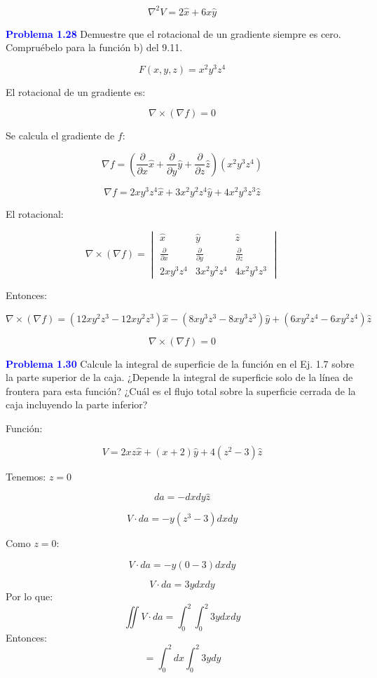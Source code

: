 \documentclass{article}
\newcommand{\question}[1]{\textcolor{blue}{\textbf{#1}}}
\begin{document}
\[
\boxed{\nabla^2 V = 2 \hat{x} + 6x \hat{y}}
\]

\question{Problema 1.28} Demuestre que el rotacional de un gradiente siempre es cero. Compruébelo para la función b) del 9.11.

\[
F(x,y,z) = x^2 y^3 z^4
\]

El rotacional de un gradiente es:

\[
\nabla \times (\nabla f) = 0
\]

Se calcula el gradiente de \( f \):

\[
\nabla f = \left( \frac{\partial}{\partial x} \hat{x} + \frac{\partial}{\partial y} \hat{y} + \frac{\partial}{\partial z} \hat{z} \right) (x^2 y^3 z^4)
\]

\[
\nabla f = 2x y^3 z^4 \hat{x} + 3x^2 y^2 z^4 \hat{y} + 4x^2 y^3 z^3 \hat{z}
\]

El rotacional:

\[
\nabla \times (\nabla f) =
\begin{vmatrix}
\hat{x} & \hat{y} & \hat{z} \\
\frac{\partial}{\partial x} & \frac{\partial}{\partial y} & \frac{\partial}{\partial z} \\
2x y^3 z^4 & 3x^2 y^2 z^4 & 4x^2 y^3 z^3
\end{vmatrix}
\]

Entonces:

\[
\nabla \times (\nabla f) = (12x y^2 z^3 - 12x y^2 z^3) \hat{x} - (8x y^3 z^3 - 8x y^3 z^3) \hat{y} + (6x y^ 2 z^4 - 6x y^2 z^4) \hat{z} 
\]

\[
\boxed{\nabla \times (\nabla f) = 0}
\]

\question{Problema  1.30} Calcule la integral de superficie de la función en el Ej. 1.7 sobre la parte superior de la caja. ¿Depende la integral de superficie solo de la línea de frontera para esta función? ¿Cuál es el flujo total sobre la superficie cerrada de la caja incluyendo la parte inferior?

Función:

\[
V = 2x z \hat{x} + (x+2) \hat{y} + 4(z^2 - 3) \hat{z}
\]

Tenemos: \( z=0 \)

\[
da = -dxdy \hat{z}
\]

\[
V \cdot da = -y (z^3 -3) dxdy
\]

Como \( z=0 \):

\[
V \cdot da = -y(0-3)dxdy
\]

\[
V \cdot da = 3y dxdy
\]
Por lo que:
\[
\iint V \cdot da = \int_0^2 \int_0^2 3y dxdy
\]
Entonces:
\[
= \int_0^2 dx \int_0^2 3y dy
\]
\end{document}
